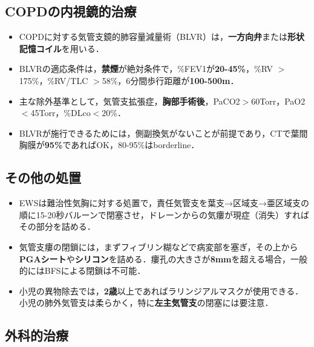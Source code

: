 \subsection{COPDの内視鏡的治療}
\begin{itemize}

\item COPDに対する気管支鏡的肺容量減量術（BLVR）は，\textbf{一方向弁}または\textbf{形状記憶コイル}を用いる．
\item BLVRの適応条件は，\textbf{禁煙}が絶対条件で，\%FEV1が\textbf{20-45\%}，\%RV $>$175\%，\%RV/TLC $>$58\%，6分間歩行距離が\textbf{100-500m}．
\item 主な除外基準として，気管支拡張症，\textbf{胸部手術後}，PaCO2$>$60Torr，PaO2$<$45Torr，\%DLco$<20$\%．
\item BLVRが施行できるためには，側副換気がないことが前提であり，CTで葉間胸膜が\textbf{95\%}であればOK，80-95\%はborderline．
\end{itemize}

\subsection{その他の処置}
\begin{itemize}
\item EWSは難治性気胸に対する処置で，責任気管支を葉支→区域支→亜区域支の順に15-20秒バルーンで閉塞させ，ドレーンからの気瘻が現症（消失）すればその部分を詰める．
\item 気管支瘻の閉鎖には，まずフィブリン糊などで病変部を塞ぎ，その上から\textbf{PGAシート}や\textbf{シリコン}を詰める．瘻孔の大きさが\textbf{8mm}を超える場合，一般的にはBFSによる閉鎖は不可能．
\item 小児の異物除去では，\textbf{2歳}以上であればラリンジアルマスクが使用できる．小児の肺外気管支は柔らかく，特に\textbf{左主気管支}の閉塞には要注意．
\end{itemize}


\subsection{外科的治療}

